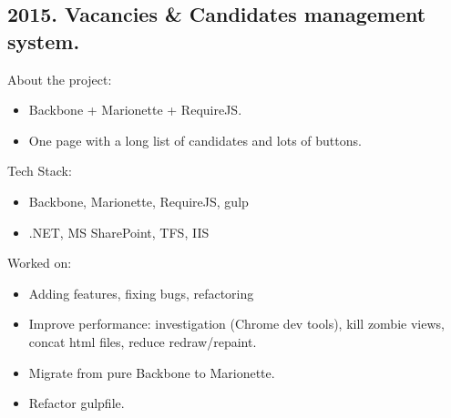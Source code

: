 \documentclass[a4paper, 14pt]{article}
\begin{document}
  \subsection{2015. Vacancies \& Candidates management system.}
    About the project:
    \begin{itemize}
      \item Backbone + Marionette + RequireJS. \\
      \item One page with a long list of candidates and lots of buttons. \\
    \end{itemize}
    Tech Stack:
    \begin{itemize}
      \item Backbone, Marionette, RequireJS, gulp \\
      \item .NET, MS SharePoint, TFS, IIS \\
    \end{itemize}
    Worked on: 
    \begin{itemize}
      \item Adding features, fixing bugs, refactoring \\
      \item Improve performance: investigation (Chrome dev tools), kill zombie views, concat html files, reduce redraw/repaint.  \\
      \item Migrate from pure Backbone to Marionette. \\
      \item Refactor gulpfile. \\
    \end{itemize}
\end{document}
